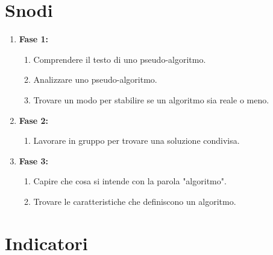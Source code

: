 \section{Snodi}

\begin{enumerate}[label=\roman*.]
    \item \textbf{Fase 1:}
    \begin{enumerate}
        \item Comprendere il testo di uno pseudo-algoritmo.
        \item Analizzare uno pseudo-algoritmo.
        \item Trovare un modo per stabilire se un algoritmo sia reale o meno.
    \end{enumerate}
    \item \textbf{Fase 2:}
    \begin{enumerate}
        \item Lavorare in gruppo per trovare una soluzione condivisa.
    \end{enumerate}
    \item \textbf{Fase 3:}
    \begin{enumerate}
        \item Capire che cosa si intende con la parola "algoritmo".
        \item Trovare le caratteristiche che definiscono un algoritmo.
    \end{enumerate}
\end{enumerate}

\section{Indicatori}

